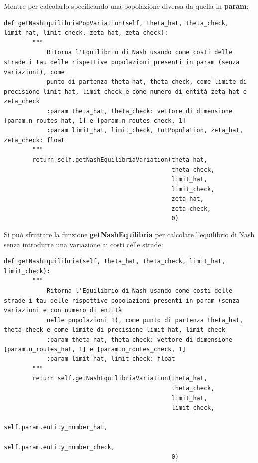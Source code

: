 Mentre per calcolarlo specificando una popolazione diversa da quella in \textbf{param}:
\begin{lstlisting}[style=myStile, caption={Computer::getNashEquilibriaCostVariation}, label={script:16}]
    def getNashEquilibriaPopVariation(self, theta_hat, theta_check, limit_hat, limit_check, zeta_hat, zeta_check):
        """
            Ritorna l'Equilibrio di Nash usando come costi delle strade i tau delle rispettive popolazioni presenti in param (senza variazioni), come
            punto di partenza theta_hat, theta_check, come limite di precisione limit_hat, limit_check e come numero di entità zeta_hat e zeta_check
            :param theta_hat, theta_check: vettore di dimensione [param.n_routes_hat, 1] e [param.n_routes_check, 1]
            :param limit_hat, limit_check, totPopulation, zeta_hat, zeta_check: float
        """
        return self.getNashEquilibriaVariation(theta_hat,
                                               theta_check,
                                               limit_hat,
                                               limit_check,
                                               zeta_hat,
                                               zeta_check,
                                               0)
\end{lstlisting}

Si può sfruttare la funzione \textbf{getNashEquilibria} per calcolare l'equilibrio di Nash senza introdurre una variazione ai costi delle strade:

\begin{lstlisting}[style=myStile, caption={Computer::getNashEquilibria}, label={script:10}]
    def getNashEquilibria(self, theta_hat, theta_check, limit_hat, limit_check):
        """
            Ritorna l'Equilibrio di Nash usando come costi delle strade i tau delle rispettive popolazioni presenti in param (senza variazioni e con numero di entità
            nelle popolazioni 1), come punto di partenza theta_hat, theta_check e come limite di precisione limit_hat, limit_check
            :param theta_hat, theta_check: vettore di dimensione [param.n_routes_hat, 1] e [param.n_routes_check, 1]
            :param limit_hat, limit_check: float
        """
        return self.getNashEquilibriaVariation(theta_hat, 
                                               theta_check, 
                                               limit_hat, 
                                               limit_check, 
                                               self.param.entity_number_hat, 
                                               self.param.entity_number_check,
                                               0)
\end{lstlisting}

